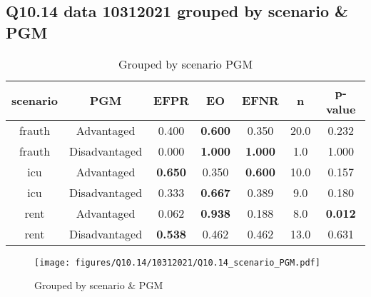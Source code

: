 \subsection{Q10.14 data 10312021 grouped by scenario \& PGM}

\begin{comment}
                             EFPR        EO      EFNR     n    pvalue
(frauth, Advantaged)     0.400000  0.600000  0.350000  20.0  0.232414
(frauth, Disadvantaged)  0.000000  1.000000  1.000000   1.0  1.000000
(icu, Advantaged)        0.650000  0.350000  0.600000  10.0  0.157299
(icu, Disadvantaged)     0.333333  0.666667  0.388889   9.0  0.180207
(rent, Advantaged)       0.062500  0.937500  0.187500   8.0  0.012419
(rent, Disadvantaged)    0.538462  0.461538  0.461538  13.0  0.630760
\end{comment}

\begin{table}[h]
    \centering
    \begin{tabular}{|c|c|c|c|c|c|c|}
        \hline
        scenario & PGM & EFPR & EO & EFNR & n & p-value\\
        \hline
        frauth & Advantaged & 0.400 & \textbf{0.600} & 0.350 & 20.0 & 0.232\\
		frauth & Disadvantaged & 0.000 & \textbf{1.000} & \textbf{1.000} & 1.0 & 1.000\\
		icu & Advantaged & \textbf{0.650} & 0.350 & \textbf{0.600} & 10.0 & 0.157\\
		icu & Disadvantaged & 0.333 & \textbf{0.667} & 0.389 & 9.0 & 0.180\\
		rent & Advantaged & 0.062 & \textbf{0.938} & 0.188 & 8.0 & \textbf{0.012}\\
		rent & Disadvantaged & \textbf{0.538} & 0.462 & 0.462 & 13.0 & 0.631\\
		
        \hline
    \end{tabular}
    \caption{Grouped by scenario PGM}
    \label{tab:my_label}
\end{table}
\begin{figure}[h]
    \centering
    \texttt{[image: figures/Q10.14/10312021/Q10.14\_scenario\_PGM.pdf]}
    \caption{Grouped by scenario \& PGM}
    \label{fig:my_label}
\end{figure}
